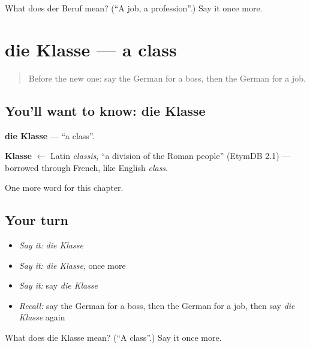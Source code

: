 \begin{tcolorbox}[breakable,colback=teal!4,colframe=teal!35!black,title={Before you move on}]
What does der Beruf mean? (\textquotedblleft{}A job, a profession\textquotedblright{}.) Say it once more.
\end{tcolorbox}
\section[die Klasse]{die Klasse — a class}

\label{lesson:GE-C127-klasse}



\begin{quote}
Before the new one: say the German for a boss, then the German for a job.
\end{quote}

\subsection*{You'll want to know: die Klasse}
\textbf{die Klasse} — \textquotedblleft{}a class\textquotedblright{}.

\begin{cousinweb}
\textbf{Klasse} $\leftarrow$ Latin \emph{classis}, \textquotedblleft{}a division of the Roman people\textquotedblright{} (EtymDB 2.1) — borrowed through French, like English \emph{class}.
\end{cousinweb}

\begin{grammarlens}[title={What you've built}]
One more word for this chapter.
\end{grammarlens}

\subsection*{Your turn}
\begin{itemize}
\raggedright
  \item \emph{Say it:} \emph{die Klasse}
  \item \emph{Say it:} \emph{die Klasse}, once more
  \item \emph{Say it:} say \emph{die Klasse}
  \item \emph{Recall:} say the German for a boss, then the German for a job, then say \emph{die Klasse} again
\end{itemize}

\begin{tcolorbox}[breakable,colback=teal!4,colframe=teal!35!black,title={Before you move on}]
What does die Klasse mean? (\textquotedblleft{}A class\textquotedblright{}.) Say it once more.
\end{tcolorbox}
